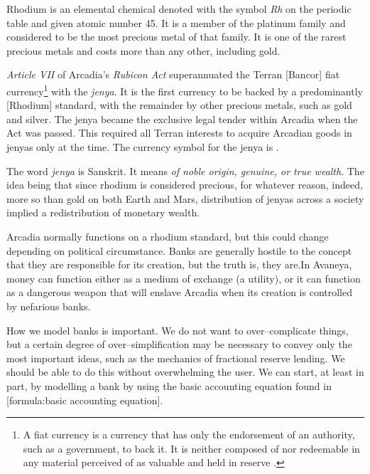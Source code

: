 Rhodium is an elemental chemical denoted with the symbol {\it Rh} on the periodic table and given atomic number 45. It is a member of the platinum family and considered to be the most precious metal of that family. It is one of the rarest precious metals and costs more than any other, including gold.

{\it Article VII} of Arcadia's {\it Rubicon Act} superannuated the Terran [Bancor] fiat currency\footnote{A fiat currency is a currency that has only the endorsement of an authority, such as a government, to back it. It is neither composed of nor redeemable in any material perceived of as valuable and held in reserve .} with the {\it jenya}. It is the first currency to be backed by a predominantly [Rhodium] standard, with the remainder by other precious metals, such as gold and silver. The jenya became the exclusive legal tender within Arcadia when the Act was passed. This required all Terran interests to acquire Arcadian goods in jenyas only at the time. The currency symbol for the jenya is .

    {}

The word {\it jenya} is Sanskrit. It means {\it of noble origin, genuine, or true wealth}. The idea being that since rhodium is considered precious, for whatever reason, indeed, more so than gold on both Earth and Mars, distribution of jenyas across a society implied a redistribution of monetary wealth.


Arcadia normally functions on a rhodium standard, but this could change depending on political circumstance. Banks are generally hostile to the concept that they are responsible for its creation, but the truth is, they are. In Avaneya, money can function either as a medium of exchange (a utility), or it can function as a dangerous weapon that will enslave Arcadia when its creation is controlled by nefarious banks.

How we model banks is important. We do not want to over--complicate things, but a certain degree of over--simplification may be necessary to convey only the most important ideas, such as the mechanics of fractional reserve lending. We should be able to do this without overwhelming the user. We can start, at least in part, by modelling a bank by using the basic accounting equation found in [formula:basic accounting equation].

